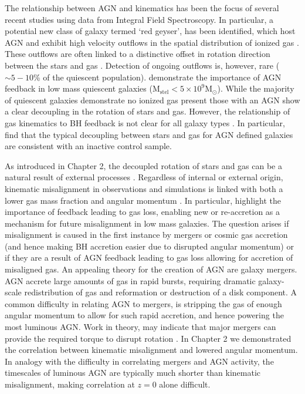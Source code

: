 The relationship between AGN and kinematics has been the focus of several recent studies using data from Integral Field Spectroscopy. In particular, a potential new class of galaxy termed `red geyser', has been identified, which host AGN and exhibit high velocity outflows in the spatial distribution of ionized gas \citep[][]{cheung2016}. These outflows are often linked to a distinctive offset in rotation direction between the stars and gas \citep{roy2018}. Detection of ongoing outflows is, however, rare ($\sim5-10$\% of the quiescent population). \citet{penny2018} demonstrate the importance of AGN feedback in low mass quiescent galaxies ($\mathrm{M_{stel} < 5 \times 10^{9}M_{\odot}}$). While the majority of quiescent galaxies demonstrate no ionized gas present those with an AGN show a clear decoupling in the rotation of stars and gas. However, the relationship of gas kinematics to BH feedback is not clear for all galaxy types \citep[see also:][]{koudmani2019}. In particular, \citet{ilha2019} find that the typical decoupling between stars and gas for AGN defined galaxies are consistent with an inactive control sample. 

As introduced in Chapter 2, the decoupled rotation of stars and gas can be a natural result of external processes \cite[e.g.][]{davis2011, barrera2015, vdvoort2015, jin2016, bryant2019, duckworth2019_halo, li_decoupling2019}. Regardless of internal or external origin, kinematic misalignment in observations and simulations is linked with both a lower gas mass fraction and angular momentum \citep[as demonstrated in Chapter 2, see also;][]{starkenburg+19, khim2019}. In particular, \citet{starkenburg+19} highlight the importance of feedback leading to gas loss, enabling new or re-accretion as a mechanism for future misalignment in low mass galaxies. The question arises if misalignment is caused in the first instance by mergers or cosmic gas accretion (and hence making BH accretion easier due to disrupted angular momentum) or if they are a result of AGN feedback leading to gas loss allowing for accretion of misaligned gas. An appealing theory for the creation of AGN are galaxy mergers. AGN accrete large amounts of gas in rapid bursts, requiring dramatic galaxy-scale redistribution of gas and reformation or destruction of a disk component. A common difficulty in relating AGN to mergers, is stripping the gas of enough angular momentum to allow for such rapid accretion, and hence powering the most luminous AGN. Work in theory, may indicate that major mergers can provide the required torque to disrupt rotation \citep[e.g.][]{toomre1972, dimatteo2005}. In Chapter 2 we demonstrated the correlation between kinematic misalignment and lowered angular momentum. In analogy with the difficulty in correlating mergers and AGN activity, the timescales of luminous AGN are typically much shorter than kinematic misalignment, making correlation at $z=0$ alone difficult. 

